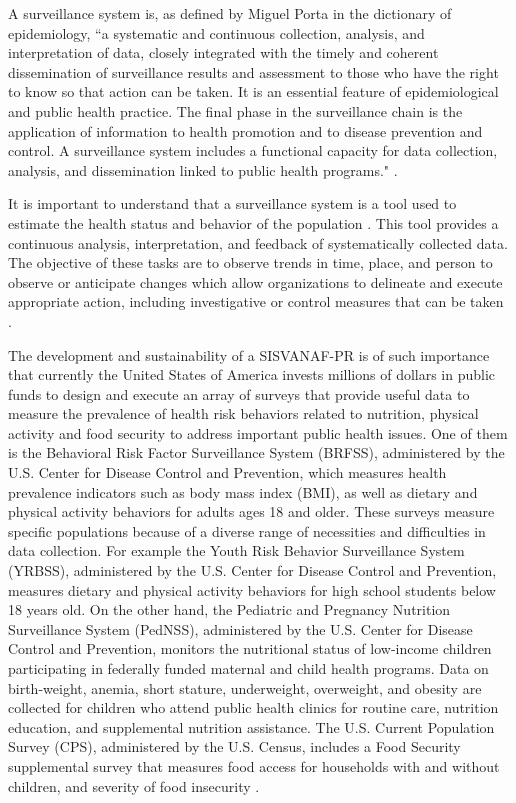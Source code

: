 \documentclass[12pt,letterpaper]{report}
\begin{document}
A surveillance system is, as defined by Miguel Porta in the dictionary of epidemiology, ``a systematic and continuous collection, analysis, and interpretation of data, closely integrated with the timely and coherent dissemination of surveillance results and assessment to those who have the right to know so that action can be taken. It is an essential feature of epidemiological and public health practice. The final phase in the surveillance chain is the application of information to health promotion and to disease prevention and control. A surveillance system includes a functional capacity for data collection, analysis, and dissemination linked to public health programs." \cite{porta2008dictionary}.

It is important to understand that a surveillance system is a tool used to estimate the health status and behavior of the population \cite{berkelman2009public}. This tool provides a continuous analysis, interpretation, and feedback of systematically collected data. The objective of these tasks are to observe trends in time, place, and person to observe or anticipate changes which allow organizations to delineate and execute appropriate action, including investigative or control measures that can be taken \cite{porta2008dictionary, thacker1998public}.

The development and sustainability of a SISVANAF-PR is of such importance that currently the United States of America invests millions of dollars in public funds to design and execute an array of surveys that provide useful data to measure the prevalence of health risk behaviors related to nutrition, physical activity and food security to address important public health issues. One of them is the Behavioral Risk Factor Surveillance System (BRFSS), administered by the U.S. Center for Disease Control and Prevention, which measures health prevalence indicators such as body mass index (BMI), as well as dietary and physical activity behaviors for adults ages 18 and older. These surveys measure specific populations because of a diverse range of necessities and difficulties in data collection. For example the Youth Risk Behavior Surveillance System (YRBSS), administered by the U.S. Center for Disease Control and Prevention, measures dietary and physical activity behaviors for high school students below 18 years old. On the other hand, the Pediatric and Pregnancy Nutrition Surveillance System (PedNSS), administered by the U.S. Center for Disease Control and Prevention, monitors the nutritional status of low-income children participating in federally funded maternal and child health programs. Data on birth-weight, anemia, short stature, underweight, overweight, and obesity are collected for children who attend public health clinics for routine care, nutrition education, and supplemental nutrition assistance. The U.S. Current Population Survey (CPS), administered by the U.S. Census, includes a Food Security supplemental survey that measures food access for households with and without children, and severity of food insecurity \cite{USfs2012}.
\end{document}

